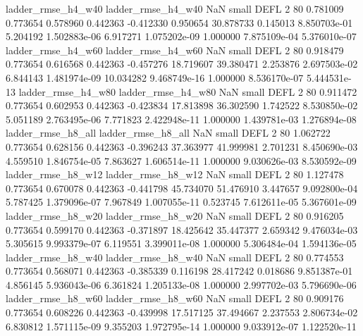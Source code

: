       ladder_rmse_h4_w40       ladder_rmse_h4_w40                   NaN      small     DEFL                 2 80 0.781009       0.773654 0.578960       0.442363   -0.412330      0.950654     30.878733     0.145013   8.850703e-01  5.204192 1.502883e-06     6.917271   1.075202e-09            1.000000    7.875109e-04        5.376010e-07
      ladder_rmse_h4_w60       ladder_rmse_h4_w60                   NaN      small     DEFL                 2 80 0.918479       0.773654 0.616568       0.442363   -0.457276     18.719607     39.380471     2.253876   2.697503e-02  6.844143 1.481974e-09    10.034282   9.468749e-16            1.000000    8.536170e-07        5.444531e-13
      ladder_rmse_h4_w80       ladder_rmse_h4_w80                   NaN      small     DEFL                 2 80 0.911472       0.773654 0.602953       0.442363   -0.423834     17.813898     36.302590     1.742522   8.530850e-02  5.051189 2.763495e-06     7.771823   2.422948e-11            1.000000    1.439781e-03        1.276894e-08
      ladder_rmse_h8_all       ladder_rmse_h8_all                   NaN      small     DEFL                 2 80 1.062722       0.773654 0.628156       0.442363   -0.396243     37.363977     41.999981     2.701231   8.450690e-03  4.559510 1.846754e-05     7.863627   1.606514e-11            1.000000    9.030626e-03        8.530592e-09
      ladder_rmse_h8_w12       ladder_rmse_h8_w12                   NaN      small     DEFL                 2 80 1.127478       0.773654 0.670078       0.442363   -0.441798     45.734070     51.476910     3.447657   9.092800e-04  5.787425 1.379096e-07     7.967849   1.007055e-11            0.523745    7.612611e-05        5.367601e-09
      ladder_rmse_h8_w20       ladder_rmse_h8_w20                   NaN      small     DEFL                 2 80 0.916205       0.773654 0.599170       0.442363   -0.371897     18.425642     35.447377     2.659342   9.476034e-03  5.305615 9.993379e-07     6.119551   3.399011e-08            1.000000    5.306484e-04        1.594136e-05
      ladder_rmse_h8_w40       ladder_rmse_h8_w40                   NaN      small     DEFL                 2 80 0.774553       0.773654 0.568071       0.442363   -0.385339      0.116198     28.417242     0.018686   9.851387e-01  4.856145 5.936043e-06     6.361824   1.205133e-08            1.000000    2.997702e-03        5.796690e-06
      ladder_rmse_h8_w60       ladder_rmse_h8_w60                   NaN      small     DEFL                 2 80 0.909176       0.773654 0.608226       0.442363   -0.439998     17.517125     37.494667     2.237553   2.806734e-02  6.830812 1.571115e-09     9.355203   1.972795e-14            1.000000    9.033912e-07        1.122520e-11

